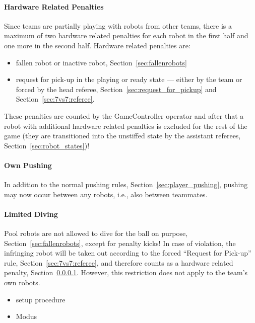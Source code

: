         \paragraph{Hardware Related Penalties}
            \label{sec:7vs7:hardware_related_penalties}
            Since teams are partially playing with robots from other teams, there is a maximum of two hardware related penalties for each robot in the first half and one more in the second half. 
            Hardware related penalties are:
            \begin{itemize}
                \item fallen robot or inactive robot, \cf Section~\ref{sec:fallenrobots}
                \item request for pick-up in the playing or ready state — either by the team or forced by the head referee, \cf Section~\ref{sec:request_for_pickup} and Section~\ref{sec:7vs7:referee}. 
            \end{itemize}
            These penalties are counted by the GameController operator and after that a robot with additional hardware related penalties is excluded for the rest of the game (they are transitioned into the unstiffed state by the assistant referees, \cf Section~\ref{sec:robot_states})!

        \paragraph{Own Pushing}
            In addition to the normal pushing rules, \cf Section~\ref{sec:player_pushing}, pushing may now occur between any robots, i.e., also between teammates.

        \paragraph{Limited Diving}
            Pool robots are not allowed to dive for the ball on purpose, \cf Section~\ref{sec:fallenrobots}, except for penalty kicks! In case of violation, the infringing robot will be taken out according to the forced ``Request for Pick-up'' rule, \cf Section~\ref{sec:7vs7:referee}, and therefore counts as a hardware related penalty, \cf Section~\ref{sec:7vs7:hardware_related_penalties}. However, this restriction does not apply to the team's own robots. 

        \begin{itemize}
            \item setup procedure %
            \item Modus %
        \end{itemize}


